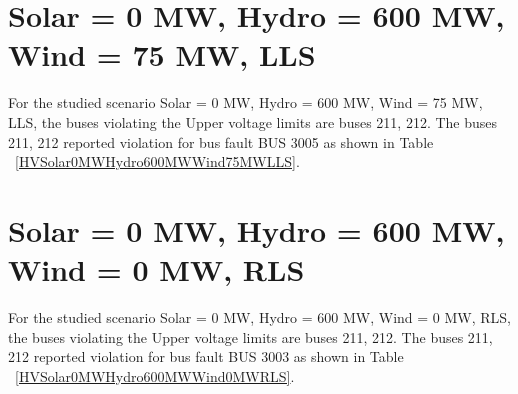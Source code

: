 \documentclass[10pt]{report}
\begin{document}
\section{Solar = 0 MW, Hydro = 600 MW, Wind = 75 MW, LLS}
For the studied scenario Solar = 0 MW, Hydro = 600 MW, Wind = 75 MW, LLS, the buses violating the Upper voltage limits are buses 211, 212.
The buses 211, 212 reported violation for bus fault BUS 3005 as shown in Table ~\ref{HVSolar0MWHydro600MWWind75MWLLS}.
\begin{table}[H]
\caption{Contingencies reporting bus voltages greater than emergency voltage of 1.1 PU for scenario Solar = 0 MW, Hydro = 600 MW, Wind = 75 MW, LLS}
\label{HVSolar0MWHydro600MWWind75MWLLS}
\centering
{}
\end{table}


\section{Solar = 0 MW, Hydro = 600 MW, Wind = 0 MW, RLS}
For the studied scenario Solar = 0 MW, Hydro = 600 MW, Wind = 0 MW, RLS, the buses violating the Upper voltage limits are buses 211, 212.
The buses 211, 212 reported violation for bus fault BUS 3003 as shown in Table ~\ref{HVSolar0MWHydro600MWWind0MWRLS}.
\begin{table}[H]
\caption{Contingencies reporting bus voltages greater than emergency voltage of 1.1 PU for scenario Solar = 0 MW, Hydro = 600 MW, Wind = 0 MW, RLS}
\label{HVSolar0MWHydro600MWWind0MWRLS}
\centering
{}
\end{table}
\end{document}
